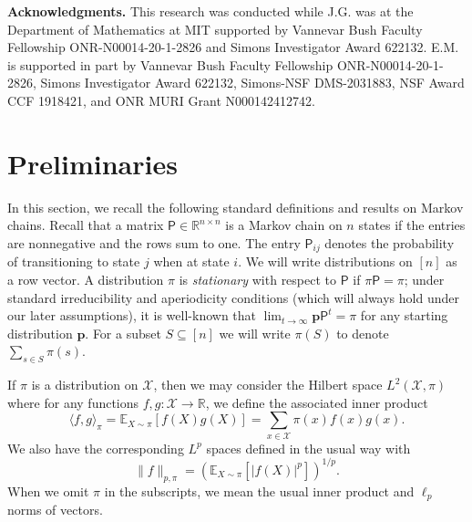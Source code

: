 \documentclass[11pt]{article}
\theoremstyle{remark}
\begin{document}
\textbf{Acknowledgments.} This research was conducted while J.G. was at the Department of Mathematics at MIT supported by Vannevar Bush Faculty Fellowship ONR-N00014-20-1-2826 and Simons Investigator Award 622132. E.M. is supported in part by Vannevar Bush Faculty Fellowship ONR-N00014-20-1-2826, Simons Investigator Award 622132, Simons-NSF DMS-2031883, NSF Award CCF 1918421, and ONR MURI Grant N000142412742.

\section{Preliminaries}
\label{sec:prelims}
In this section, we recall the following standard definitions and results on Markov chains. Recall that a matrix $\mathsf{P}\in \mathbb{R}^{n\times n}$ is a Markov chain on $n$ states if the entries are nonnegative and the rows sum to one. The entry $\mathsf{P}_{ij}$ denotes the probability of transitioning to state $j$ when at state $i$. We will write distributions on $[n]$ as a row vector. A distribution $\pi$ is \emph{stationary} with respect to $\mathsf{P}$ if $\pi \mathsf{P}=\pi$; under standard irreducibility and aperiodicity conditions (which will always hold under our later assumptions), it is well-known that $\lim_{t\to \infty} \bm{p}\mathsf{P}^t=\pi$ for any starting distribution $\bm{p}$. For a subset $S\subseteq [n]$ we will write $\pi(S)$ to denote $\sum_{s\in S} \pi(s)$.

If $\pi$ is a distribution on $\mathcal{X}$, then we may consider the Hilbert space $L^2(\mathcal{X},\pi)$ where for any functions $f,g:\mathcal{X}\to \mathbb{R}$, we define the associated inner product
\begin{equation*}
    \langle f,g\rangle_{\pi}=\mathbb{E}_{X\sim \pi}[f(X)g(X)] = \sum_{x\in \mathcal{X}}\pi(x)f(x)g(x).
\end{equation*}
We also have the corresponding $L^p$ spaces defined in the usual way with
\begin{equation*}
\|f\|_{p,\pi}=\left(\mathbb{E}_{X\sim \pi}[\vert f(X)\vert^p]\right)^{1/p}.
\end{equation*}
When we omit $\pi$ in the subscripts, we mean the usual inner product and $\ell_p$ norms of vectors. 
\end{document}
